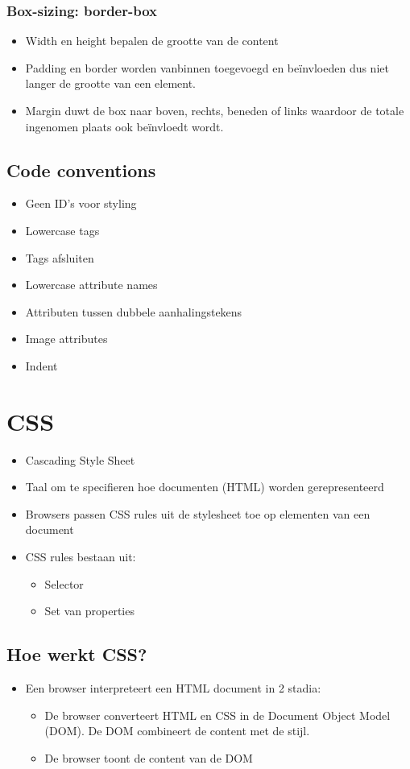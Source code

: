 \documentclass{article}
\begin{document}
\subsubsection{Box-sizing: border-box}
\begin{itemize}
    \item Width en height bepalen de grootte van de content
    \item Padding en border worden vanbinnen toegevoegd en beïnvloeden dus niet langer de grootte van een element.
    \item Margin duwt de box naar boven, rechts, beneden of links waardoor de totale ingenomen plaats ook beïnvloedt wordt.
\end{itemize}

\subsection{Code conventions}
\begin{itemize}
    \item Geen ID's voor styling
    \item Lowercase tags
    \item Tags afsluiten
    \item Lowercase attribute names
    \item Attributen tussen dubbele aanhalingstekens
    \item Image attributes
    \item Indent
\end{itemize}

\section{CSS}
\begin{itemize}
    \item Cascading Style Sheet
    \item Taal om te specifieren hoe documenten (HTML) worden gerepresenteerd
    \item Browsers passen CSS rules uit de stylesheet toe op elementen van een document
    \item CSS rules bestaan uit:
    \begin{itemize}
        \item Selector
        \item Set van properties
    \end{itemize}
\end{itemize}

\subsection{Hoe werkt CSS?}
\begin{itemize}
    \item Een browser interpreteert een HTML document in 2 stadia:
    \begin{itemize}
        \item De browser converteert HTML en CSS in de Document Object Model (DOM). De DOM combineert de content met de stijl.
        \item De browser toont de content van de DOM
    \end{itemize}
\end{itemize}
\end{document}
